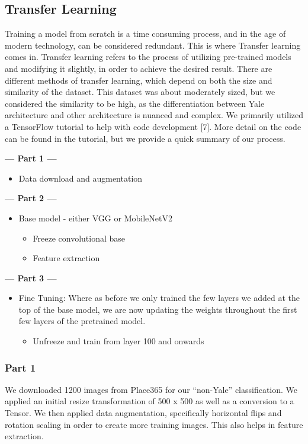 \documentclass[letterpaper]{article} %
\begin{document}
\subsection{Transfer Learning}
Training a model from scratch is a time consuming process, and in the age of modern technology, can be considered redundant. This is where Transfer learning comes in. Transfer learning refers to the process of utilizing pre-trained models and modifying it slightly, in order to achieve the desired result. There are different methods of transfer learning, which depend on both the size and similarity of the dataset. This dataset was about moderately sized, but we considered the similarity to be high, as the differentiation between Yale architecture and other architecture is nuanced and complex. We primarily utilized a TensorFlow tutorial to help with code development [7]. More detail on the code can be found in the tutorial, but we provide a quick summary of our process. 



\noindent\textbf{--- Part 1 ---}
\begin{itemize}
    \item Data download and augmentation
\end{itemize}
\textbf{--- Part 2 ---}
\begin{itemize}
    \item Base model - either VGG or MobileNetV2
    \begin{itemize}
        \item Freeze convolutional base
        \item Feature extraction
    \end{itemize}
\end{itemize}
\textbf{--- Part 3 ---}
\begin{itemize}
    \item Fine Tuning: Where as before we only trained the few layers we added at the top of the base model, we are now updating the weights throughout the first few layers of the pretrained model.
    \begin{itemize}
        \item Unfreeze and train from layer 100 and onwards
    \end{itemize}
\end{itemize}


\subsubsection{Part 1}
We downloaded 1200 images from Place365 for our “non-Yale” classification. We applied an initial resize transformation of 500 x 500 as well as a conversion to a Tensor. We then applied data augmentation, specifically horizontal flips and rotation scaling in order to create more training images. This also helps in feature extraction. 
\end{document}
